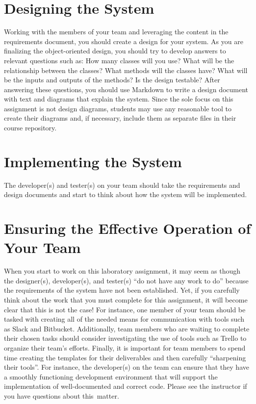 \section*{Designing the System}

Working with the members of your team and leveraging the content in the requirements document, you should create a
design for your system.  As you are finalizing the object-oriented design, you should try to develop answers to relevant
questions such as: How many classes will you use? What will be the relationship between the classes? What methods will
the classes have? What will be the inputs and outputs of the methods?  Is the design testable?  After answering these
questions, you should use Markdown to write a design document with text and diagrams that explain the system. Since the
sole focus on this assignment is not design diagrams, students may use any reasonable tool to create their diagrams and,
if necessary, include them as separate files in their course repository.

\section*{Implementing the System}

The developer(s) and tester(s) on your team should take the requirements and design documents and start to think about
how the system will be implemented.

\section*{Ensuring the Effective Operation of Your Team}

When you start to work on this laboratory assignment, it may seem as though the designer(s), developer(s), and tester(s)
``do not have any work to do'' because the requirements of the system have not been established. Yet, if you carefully
think about the work that you must complete for this assignment, it will become clear that this is not the case! For
instance, one member of your team should be tasked with creating all of the needed means for communication with tools
such as Slack and Bitbucket. Additionally, team members who are waiting to complete their chosen tasks should consider
investigating the use of tools such as Trello to organize their team's efforts. Finally, it is important for team
members to spend time creating the templates for their deliverables and then carefully ``sharpening their tools''. For
instance, the developer(s) on the team can ensure that they have a smoothly functioning development environment that
will support the implementation of well-documented and correct code. Please see the instructor if you have questions
about \mbox{this matter}.


